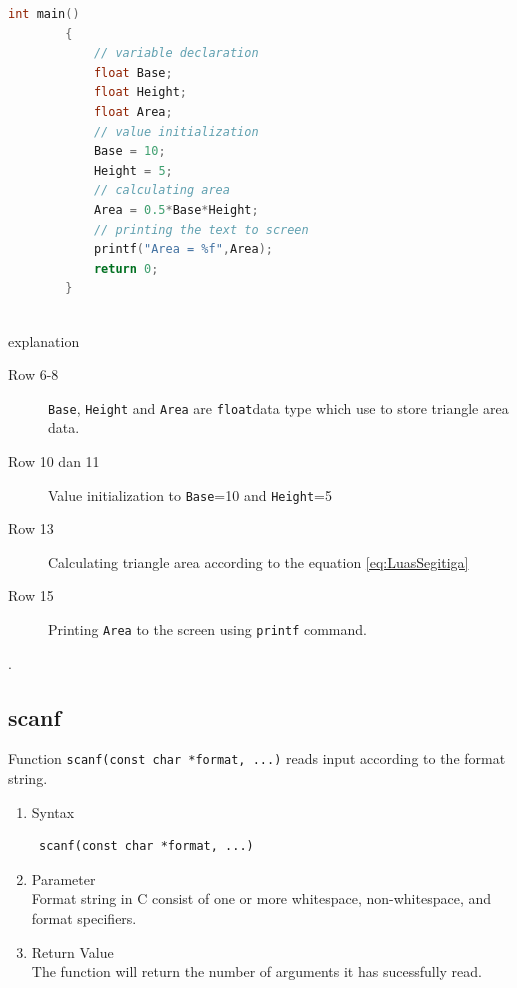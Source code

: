 \begin{description}
\begin{lstlisting}[language=c,captionpos=t]
		int main()
		{
			// variable declaration
			float Base;
			float Height;
			float Area;
			// value initialization
			Base = 10;
			Height = 5;
			// calculating area
			Area = 0.5*Base*Height;
			// printing the text to screen
			printf("Area = %f",Area);
			return 0;
		}
		
	\end{lstlisting}

		explanation
		\begin{description}
			\item[Row 6-8]  \verb|Base|, \verb|Height| and \verb|Area| are \verb|float|data type which use to store triangle area data.
			\item[Row 10 dan 11] Value initialization to \verb|Base|=10 and \verb|Height|=5
			\item[Row 13] Calculating triangle area according to  the equation \ref{eq:LuasSegitiga}
			\item[Row 15] Printing \verb|Area| to the screen using \verb|printf| command.
		\end{description}
\end{description}

.\subsection{scanf}
Function \verb*|scanf(const char *format, ...)| reads input according to the format string.

\begin{enumerate}
	\item Syntax
	      \begin{verbatim} scanf(const char *format, ...)
	\end{verbatim}
	\item Parameter \\
	      Format string in C consist of one or more whitespace, non-whitespace, and format specifiers.
	\item Return Value \\
	      The function will return the number of arguments it has sucessfully read.

\end{enumerate}

